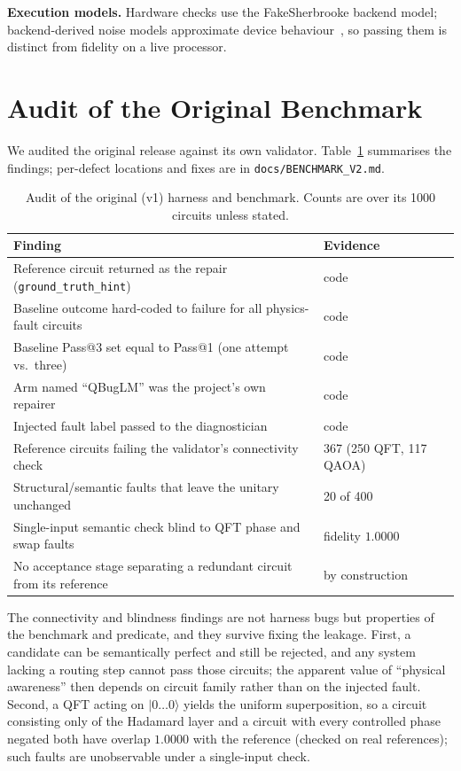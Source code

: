 \documentclass[journal]{IEEEtran}
\begin{document}
\textbf{Execution models.} Hardware checks use the FakeSherbrooke backend model;
backend-derived noise models approximate device behaviour~\cite{ibmnoise}, so
passing them is distinct from fidelity on a live processor.

\section{Audit of the Original Benchmark}
\label{sec:audit}

We audited the original release against its own validator. Table~\ref{tab:audit}
summarises the findings; per-defect locations and fixes are in
\texttt{docs/BENCHMARK\_V2.md}.

\begin{table}[t]
\centering
\caption{Audit of the original (v1) harness and benchmark. Counts are over its
1000 circuits unless stated.}
\label{tab:audit}
\footnotesize
\setlength{\tabcolsep}{3pt}
\begin{tabular}{p{}p{}}
\toprule
Finding & Evidence \\
\midrule
Reference circuit returned as the repair (\texttt{ground\_truth\_hint}) & code \\
Baseline outcome hard-coded to failure for all physics-fault circuits & code \\
Baseline Pass@3 set equal to Pass@1 (one attempt vs.\ three) & code \\
Arm named ``QBugLM'' was the project's own repairer & code \\
Injected fault label passed to the diagnostician & code \\
Reference circuits failing the validator's connectivity check & 367 (250 QFT, 117 QAOA) \\
Structural/semantic faults that leave the unitary unchanged & 20 of 400 \\
Single-input semantic check blind to QFT phase and swap faults & fidelity $1.0000$ \\
No acceptance stage separating a redundant circuit from its reference & by construction \\
\bottomrule
\end{tabular}
\end{table}

The connectivity and blindness findings are not harness bugs but properties of the
benchmark and predicate, and they survive fixing the leakage. First, a candidate
can be semantically perfect and still be rejected, and any system lacking a
routing step cannot pass those circuits; the apparent value of ``physical
awareness'' then depends on circuit family rather than on the injected fault.
Second, a QFT acting on $\lvert 0\ldots0\rangle$ yields the uniform
superposition, so a circuit consisting only of the Hadamard layer and a circuit
with every controlled phase negated both have overlap $1.0000$ with the
reference (checked on real references); such faults are unobservable under a
single-input check.
\end{document}
